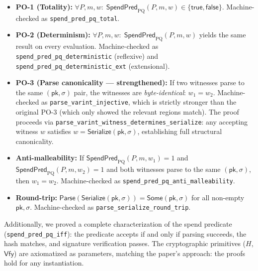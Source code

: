 \documentclass[11pt]{article}
\newcommand{\SpendPred}{\mathsf{SpendPred}}
\newcommand{\SpendPredPQ}{\SpendPred_{\mathrm{PQ}}}
\begin{document}
\begin{itemize}[leftmargin=2em]
  \item \textbf{PO-1 (Totality):} $\forall P,m,w:\; \SpendPredPQ(P,m,w)\in\{\mathsf{true},\mathsf{false}\}$.
  Machine-checked as \texttt{spend\_pred\_pq\_total}.
  \item \textbf{PO-2 (Determinism):} $\forall P,m,w:\; \SpendPredPQ(P,m,w)$ yields the same result on every evaluation.
  Machine-checked as \texttt{spend\_pred\_pq\_deterministic} (reflexive) and \texttt{spend\_pred\_pq\_deterministic\_ext} (extensional).
  \item \textbf{PO-3 (Parse canonicality --- strengthened):} If two witnesses parse to the same $(\mathsf{pk},\sigma)$ pair, the witnesses are \emph{byte-identical}: $w_1 = w_2$.
  Machine-checked as \texttt{parse\_varint\_injective}, which is strictly stronger than the original PO-3 (which only showed the relevant regions match).
  The proof proceeds via \texttt{parse\_varint\_witness\_determines\_serialize}: any accepting witness $w$ satisfies $w = \textsf{Serialize}(\mathsf{pk},\sigma)$, establishing full structural canonicality.
  \item \textbf{Anti-malleability:} If $\SpendPredPQ(P,m,w_1)=1$ and $\SpendPredPQ(P,m,w_2)=1$ and both witnesses parse to the same $(\mathsf{pk},\sigma)$, then $w_1=w_2$.
  Machine-checked as \texttt{spend\_pred\_pq\_anti\_malleability}.
  \item \textbf{Round-trip:} $\textsf{Parse}(\textsf{Serialize}(\mathsf{pk},\sigma)) = \textsf{Some}(\mathsf{pk},\sigma)$ for all non-empty $\mathsf{pk},\sigma$.
  Machine-checked as \texttt{parse\_serialize\_round\_trip}.
\end{itemize}

Additionally, we proved a complete characterization of the spend predicate (\texttt{spend\_pred\_pq\_iff}): the predicate accepts if and only if parsing succeeds, the hash matches, and signature verification passes.
The cryptographic primitives ($H$, $\mathsf{Vfy}$) are axiomatized as parameters, matching the paper's approach: the proofs hold for any instantiation.
\end{document}
